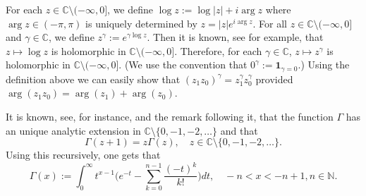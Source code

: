 \documentclass[12pt,a4paper]{amsart}
\theoremstyle{plain}
\theoremstyle{definition}
\numberwithin{equation}{section}
\begin{document}
	For each $z\in \mathbb C\setminus (-\infty,0]$, we define
$
	\log z := \log |z| + i \arg z
$
	where $\arg z \in (-\pi,\pi)$ is uniquely determined by
$
	z = |z|e^{i \arg z}.
$ 	
	For all $z\in \mathbb C\setminus (-\infty,0]$ and $\gamma \in \mathbb C$, we define
$
	z^\gamma := e^{\gamma \log z}.
$
	Then it is known, see \cite[Theorem 6.1]{SteinShakarchi2003Complex} for example, that $z\mapsto \log z$ is holomorphic in $\mathbb C\setminus (-\infty,0]$.
	Therefore, for each $\gamma \in \mathbb C$, $z\mapsto z^\gamma$ is holomorphic in $\mathbb C\setminus (-\infty,0]$. (We use the convention that  $0^\gamma := \mathbf 1_{\gamma = 0}$.)
    Using the definition above we can easily show that $(z_1z_0)^\gamma = z_1^\gamma z_0^\gamma$ provided $\arg (z_1z_0)=\arg (z_1) + \arg(z_0)$.

	It is known, see, for instance, \cite[Theorem 6.1.3]{SteinShakarchi2003Complex} and the remark following it, that the function $\Gamma$ has an unique analytic extension in $\mathbb C\setminus\{0, -1,-2,\dots\}$ and that
\[
	\Gamma(z+1) = z \Gamma(z),\quad z\in \mathbb C\setminus\{0, -1,-2,\dots\}.
\]
	Using this recursively, one gets that
\begin{equation}
\label{eq: definition of Gamma function}
    \Gamma(x)
    := \int_0^\infty t^{x-1} \Big(e^{-t} - \sum_{k=0}^{n-1} \frac{(-t)^k}{k!}\Big) dt,
    \quad -n< x< -n+1, n\in \mathbb N.
\end{equation}
\end{document}
